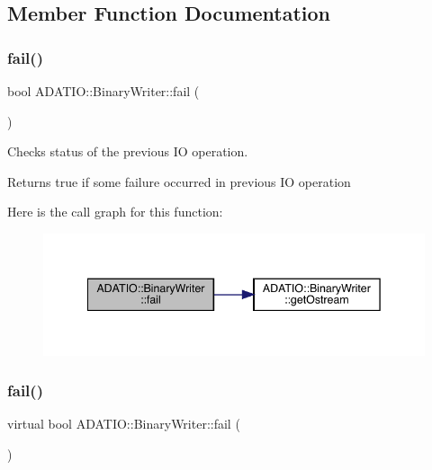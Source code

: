 \subsection{Member Function Documentation}
\mbox{\label{classADATIO_1_1BinaryWriter_a68812ccfcedfce8b5459b1327e9b03cb}} 
\subsubsection{\texorpdfstring{fail()}{fail()}\hspace{0.1cm}{\footnotesize\ttfamily [1/3]}}
{\footnotesize\ttfamily bool A\+D\+A\+T\+I\+O\+::\+Binary\+Writer\+::fail (\begin{DoxyParamCaption}{ }\end{DoxyParamCaption})\hspace{0.3cm}{\ttfamily [virtual]}}



Checks status of the previous IO operation. 

\begin{DoxyReturn}{Returns}
true if some failure occurred in previous IO operation 
\end{DoxyReturn}
Here is the call graph for this function\+:
\nopagebreak
\begin{figure}[H]
\begin{center}
\leavevmode
\includegraphics[width=342pt]{db/dee/classADATIO_1_1BinaryWriter_a68812ccfcedfce8b5459b1327e9b03cb_cgraph}
\end{center}
\end{figure}
\mbox{\label{classADATIO_1_1BinaryWriter_af549adfdbe2c671008ad58952b34b06e}} 
\subsubsection{\texorpdfstring{fail()}{fail()}\hspace{0.1cm}{\footnotesize\ttfamily [2/3]}}
{\footnotesize\ttfamily virtual bool A\+D\+A\+T\+I\+O\+::\+Binary\+Writer\+::fail (\begin{DoxyParamCaption}{ }\end{DoxyParamCaption})\hspace{0.3cm}{\ttfamily [virtual]}}



